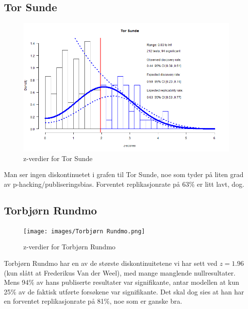 \documentclass[doc,norsk]{apa7}
\begin{document}
\subsection{Tor Sunde}
\begin{figure}[h!]
    \centering
    \includegraphics[width=\textwidth]{images/Tor Sunde.png}
    \caption{z-verdier for Tor Sunde}
\end{figure}
Man ser ingen diskontinuetet i grafen til Tor Sunde, noe som tyder på liten grad av p-hacking/publiseringsbias. Forventet replikasjonrate på $63\%$ er litt lavt, dog.

\subsection{Torbjørn Rundmo}
\begin{figure}[h!]
    \centering
    \texttt{[image: images/Torbjørn Rundmo.png]}
    \caption{z-verdier for Torbjørn Rundmo}
\end{figure}
Torbjørn Rundmo har en av de største diskontinuitetene vi har sett ved $z=1.96$ (kun slått at Frederikus Van der Weel), med mange manglende nullresultater. Mens 94\% av hans publiserte resultater var signifikante, antar modellen at kun 25\% av de faktisk utførte forsøkene var signifikante. Det skal dog sies at han har en forventet replikasjonrate på 81\%, noe som er ganske bra.
\end{document}
